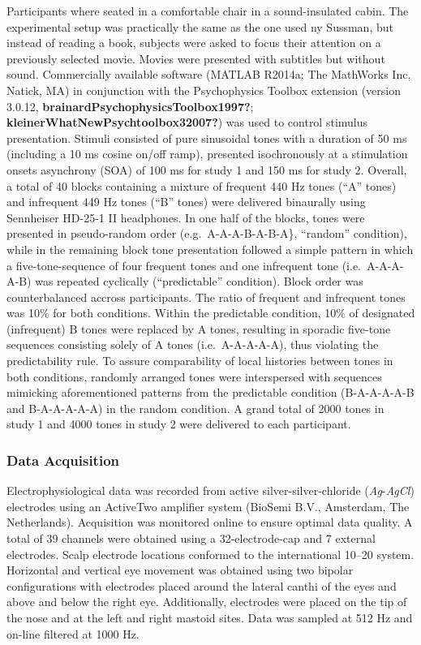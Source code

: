 \documentclass[stu,a4paper,12pt, nofontenc, babel, american]{apa7}
\begin{document}
Participants where seated in a comfortable chair in a sound-insulated
cabin. The experimental setup was practically the same as the one used
ny Sussman, but instead of reading a book, subjects were asked to focus
their attention on a previously selected movie. Movies were presented
with subtitles but without sound. Commercially available software
(MATLAB R2014a; The MathWorks Inc, Natick, MA) in conjunction with the
Psychophysics Toolbox extension (version 3.0.12,
\textbf{brainardPsychophysicsToolbox1997?};
\textbf{kleinerWhatNewPsychtoolbox32007?}) was used to control stimulus
presentation. Stimuli consisted of pure sinusoidal tones with a duration
of 50 ms (including a 10 ms cosine on/off ramp), presented isochronously
at a stimulation onsets asynchrony (SOA) of 100 ms for study 1 and 150
ms for study 2. Overall, a total of 40 blocks containing a mixture of
frequent 440 Hz tones (\enquote{A} tones) and infrequent 449 Hz tones
(\enquote{B} tones) were delivered binaurally using Sennheiser HD-25-1
II headphones. In one half of the blocks, tones were presented in
pseudo-random order (e.g.~A-A-A-B-A-B-A\}, \enquote{random} condition),
while in the remaining block tone presentation followed a simple pattern
in which a five-tone-sequence of four frequent tones and one infrequent
tone (i.e.~A-A-A-A-B) was repeated cyclically (\enquote{predictable}
condition). Block order was counterbalanced accross participants. The
ratio of frequent and infrequent tones was 10\% for both conditions.
Within the predictable condition, 10\% of designated (infrequent) B
tones were replaced by A tones, resulting in sporadic five-tone
sequences consisting solely of A tones (i.e.~A-A-A-A-A), thus violating
the predictability rule. To assure comparability of local histories
between tones in both conditions, randomly arranged tones were
interspersed with sequences mimicking aforementioned patterns from the
predictable condition (B-A-A-A-A-B and B-A-A-A-A-A) in the random
condition. A grand total of 2000 tones in study 1 and 4000 tones in
study 2 were delivered to each participant.

\hypertarget{data-acquisition-1}{%
\subsubsection{Data Acquisition}\label{data-acquisition-1}}

Electrophysiological data was recorded from active
silver-silver-chloride (\emph{Ag}-\emph{AgCl}) electrodes using an
ActiveTwo amplifier system (BioSemi B.V., Amsterdam, The Netherlands).
Acquisition was monitored online to ensure optimal data quality. A total
of 39 channels were obtained using a 32-electrode-cap and 7 external
electrodes. Scalp electrode locations conformed to the international
10--20 system. Horizontal and vertical eye movement was obtained using
two bipolar configurations with electrodes placed around the lateral
canthi of the eyes and above and below the right eye. Additionally,
electrodes were placed on the tip of the nose and at the left and right
mastoid sites. Data was sampled at 512 Hz and on-line filtered at 1000
Hz.
\end{document}
